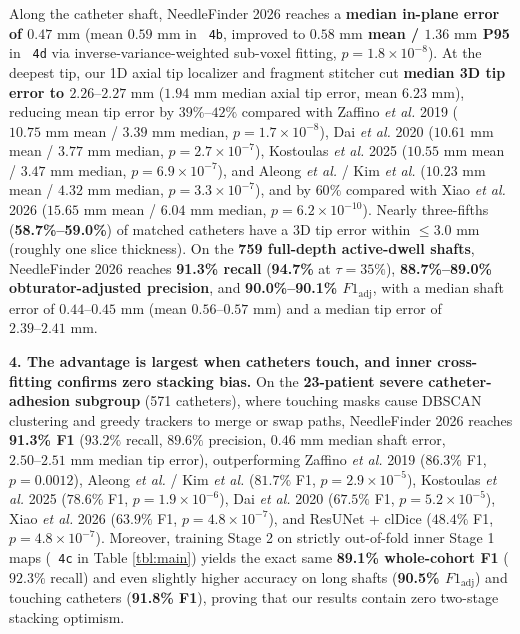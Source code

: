 \documentclass[
  11pt,
]{article}
\let\nforigtexttt\texttt
\renewcommand{\texttt}[1]{\nforigtexttt{\XeTeXinterchartokenstate=1 #1}}
\begin{document}
Along the catheter shaft, NeedleFinder 2026 reaches a \textbf{median
in-plane error of \(0.47\text{ mm}\)} (mean \(0.59\text{ mm}\) in
\texttt{4b}, improved to \textbf{\(0.58\text{ mm}\) mean /
\(1.36\text{ mm}\) P95} in \texttt{4d} via inverse-variance-weighted
sub-voxel fitting, \(p = 1.8 \times 10^{-8}\)). At the deepest tip, our
1D axial tip localizer and fragment stitcher cut \textbf{median 3D tip
error to \(2.26\text{--}2.27\text{ mm}\)} (\(1.94\text{ mm}\) median
axial tip error, mean \(6.23\text{ mm}\)), reducing mean tip error by
\(39\%\text{--}42\%\) compared with Zaffino \emph{et al.} 2019
(\(10.75\text{ mm}\) mean / \(3.39\text{ mm}\) median,
\(p = 1.7 \times 10^{-8}\)), Dai \emph{et al.} 2020 (\(10.61\text{ mm}\)
mean / \(3.77\text{ mm}\) median, \(p = 2.7 \times 10^{-7}\)), Kostoulas
\emph{et al.} 2025 (\(10.55\text{ mm}\) mean / \(3.47\text{ mm}\)
median, \(p = 6.9 \times 10^{-7}\)), and Aleong \emph{et al.} / Kim
\emph{et al.} (\(10.23\text{ mm}\) mean / \(4.32\text{ mm}\) median,
\(p = 3.3 \times 10^{-7}\)), and by \(60\%\) compared with Xiao \emph{et
al.} 2026 (\(15.65\text{ mm}\) mean / \(6.04\text{ mm}\) median,
\(p = 6.2 \times 10^{-10}\)). Nearly three-fifths
(\textbf{58.7\%--59.0\%}) of matched catheters have a 3D tip error
within \(\le 3.0\text{ mm}\) (roughly one slice thickness). On the
\textbf{759 full-depth active-dwell shafts}, NeedleFinder 2026 reaches
\textbf{91.3\% recall} (\textbf{94.7\%} at \(\tau = 35\%\)),
\textbf{88.7\%--89.0\% obturator-adjusted precision}, and
\textbf{90.0\%--90.1\% \(F1_{\text{adj}}\)}, with a median shaft error
of \textbf{\(0.44\text{--}0.45\text{ mm}\)} (mean
\(0.56\text{--}0.57\text{ mm}\)) and a median tip error of
\textbf{\(2.39\text{--}2.41\text{ mm}\)}.

\textbf{4. The advantage is largest when catheters touch, and inner
cross-fitting confirms zero stacking bias.} On the \textbf{23-patient
severe catheter-adhesion subgroup} (571 catheters), where touching masks
cause DBSCAN clustering and greedy trackers to merge or swap paths,
NeedleFinder 2026 reaches \textbf{91.3\% F1} (\(93.2\%\) recall,
\(89.6\%\) precision, \(0.46\text{ mm}\) median shaft error,
\(2.50\text{--}2.51\text{ mm}\) median tip error), outperforming Zaffino
\emph{et al.} 2019 (\(86.3\%\) F1, \(p = 0.0012\)), Aleong \emph{et al.}
/ Kim \emph{et al.} (\(81.7\%\) F1, \(p = 2.9 \times 10^{-5}\)),
Kostoulas \emph{et al.} 2025 (\(78.6\%\) F1,
\(p = 1.9 \times 10^{-6}\)), Dai \emph{et al.} 2020 (\(67.5\%\) F1,
\(p = 5.2 \times 10^{-5}\)), Xiao \emph{et al.} 2026 (\(63.9\%\) F1,
\(p = 4.8 \times 10^{-7}\)), and ResUNet + clDice (\(48.4\%\) F1,
\(p = 4.8 \times 10^{-7}\)). Moreover, training Stage 2 on strictly
out-of-fold inner Stage 1 maps (\texttt{4c} in Table \ref{tbl:main})
yields the exact same \textbf{89.1\% whole-cohort F1} (\(92.3\%\)
recall) and even slightly higher accuracy on long shafts (\textbf{90.5\%
\(F1_{\text{adj}}\)}) and touching catheters (\textbf{91.8\% F1}),
proving that our results contain zero two-stage stacking optimism.
\end{document}
